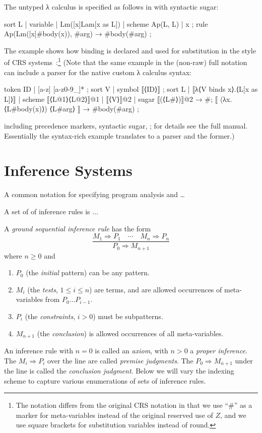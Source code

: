 \documentclass[letterpaper,11pt]{article}
\begin{document}
\begin{example}
  The untyped λ calculus is specified as follows in \hax with syntactic sugar:
  \begin{hacs}
    sort L | variable | Lm([x]Lam[x as L]) | scheme Ap(L, L) | x ;
    rule Ap(Lm([x]#body(x)), #arg) →  #body(#arg) ;
  \end{hacs}
  The example shows how binding is declared and used for substitution in the style of CRS
  systems~\cite{Klop+:tcs1993}:\footnote{The notation differs from the original CRS notation in that
    we use ``\#'' as a marker for meta-variables instead of the original reserved use of $Z$, and we
    use square brackets for substitution variables instead of round.}
  (Note that the same example in the (non-raw) full \HAX notation can include a parser for the
  native custom λ calculus syntax:
  \begin{hacs}
    token ID | [a-z] [a-z0-9_]* ;
    sort V | symbol ⟦⟨ID⟩⟧ ;
    sort L | ⟦λ⟨V binds x⟩.⟨L[x as L]⟩⟧ | scheme ⟦⟨L@1⟩⟨L@2⟩⟧@1
           | ⟦⟨V⟩⟧@2 | sugar ⟦(⟨L#⟩)⟧@2 →  #;
    ⟦ (λx.⟨L#body(x)⟩) ⟨L#arg⟩ ⟧ →  #body(#arg) ;
  \end{hacs}
  including precedence markers, syntactic sugar, \etc; for details see the full \HAX
  manual. Essentially the syntax-rich example translates to a parser and the former.)
\end{example}

\section{Inference Systems}
\label{sec:infer}

A common notation for specifying program analysis and …

A set of of inference rules is ...

\begin{definition}
  A \HAX \emph{ground sequential inference rule} has the form
  \begin{equation}
    \dfrac{ M_1 ⇒ P_1 \quad\cdots\quad M_n ⇒ P_n }{ P_0 ⇒ M_{n+1} }
    \label{eq:infer}
  \end{equation}
  where $n≥0$ and
  \begin{enumerate}
  \item $P_0$ (the \emph{initial} pattern) can be any \HAX pattern.
  \item $M_i$ (the \emph{tests}, $1≤i≤n$) are \HAX terms, and are allowed occurrences of meta-variables from $P_0…P_{i-1}$.
  \item $P_i$ (the \emph{constraints}, $i>0$) must be \HAX subpatterns.
  \item $M_{n+1}$ (the \emph{conclusion}) is allowed occurrences of all meta-variables.
  \end{enumerate}
  An inference rule with $n=0$ is called an \emph{axiom}, with $n>0$ a \emph{proper inference}.
  The $M_i⇒P_i$ over the line are called \emph{premise judgments}. The $P_0⇒M_{n+1}$ under the line
  is called the \emph{conclusion judgment}.
  Below we will vary the indexing scheme to capture various enumerations of sets of inference rules.
\end{definition}
\end{document}

